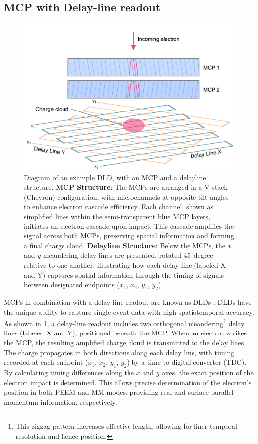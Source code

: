 \subsection{MCP with Delay-line readout}
\begin{figure}
    \centering
    \includegraphics[width=0.9\linewidth]{images/dld.pdf}
    \caption{Diagram of an example \gls{DLD}, with an \gls{MCP} and a delayline structure. \textbf{\gls{MCP} Structure}: The \glspl{MCP} are arranged in a V-stack (Chevron) configuration, with microchannels at opposite tilt angles to enhance electron cascade efficiency. Each channel, shown as simplified lines within the semi-transparent blue \gls{MCP} layers, initiates an electron cascade upon impact. This cascade amplifies the signal across both \glspl{MCP}, preserving spatial information and forming a final charge cloud. \textbf{Delayline Structure}: Below the \glspl{MCP}, the $x$ and $y$ meandering delay lines are presented, rotated \qty{45}{degree} relative to one another, illustrating how each delay line (labeled X and Y) captures spatial information through the timing of signals between designated endpoints ($x_1$, $x_2$, $y_1$, $y_2$).}
    \label{fig:dld}
\end{figure}
\Glspl{MCP} in combination with a delay-line readout are known as \glspl{DLD} \cite{oelsnerMicrospectroscopyImagingUsing2001}. \Glspl{DLD} have the unique ability to capture single-event data with high spatiotemporal accuracy. As shown in \cref{fig:dld}, a delay-line readout includes two orthogonal meandering\footnote{This zigzag pattern increases effective length, allowing for finer temporal resolution and hence position.} delay lines (labeled X and Y), positioned beneath the MCP. When an electron strikes the \gls{MCP}, the resulting amplified charge cloud is transmitted to the delay lines. The charge propagates in both directions along each delay line, with timing recorded at each endpoint ($x_1$, $x_2$, $y_1$, $y_2$) by a time-to-digital converter (TDC). By calculating timing differences along the $x$ and $y$ axes, the exact position of the electron impact is determined. This allows precise determination of the electron's position in both \gls{PEEM} and \gls{MM} modes, providing real and surface parallel momentum information, respectively.

